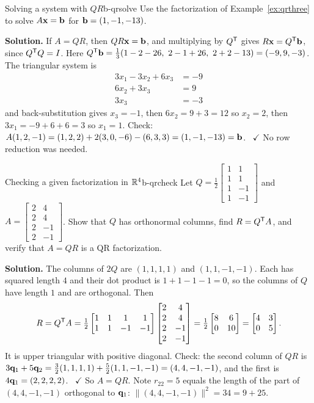 \documentclass[11pt]{article}
\begin{document}
\begin{exmp}{Solving a system with $QR$}{b-qrsolve}
Use the factorization of Example~\ref{ex:qrthree} to solve $A\mathbf{x}=\mathbf{b}$ for $\mathbf{b}=(1,-1,-13)$.

\textbf{Solution.} If $A=QR$, then $QR\mathbf{x}=\mathbf{b}$, and multiplying by $Q^{\mathsf T}$ gives $R\mathbf{x}=Q^{\mathsf T}\mathbf{b}$, since $Q^{\mathsf T} Q=I$. Here $Q\T\bv{b}=\tfrac13(1-2-26,\ 2-1+26,\ 2+2-13)=(-9,9,-3)$. The triangular system is
\[
\begin{aligned}3x_1-3x_2+6x_3&=-9\\6x_2+3x_3&=9\\3x_3&=-3\end{aligned}
\]
and back-substitution gives $x_3=-1$, then $6x_2=9+3=12$ so $x_2=2$, then $3x_1=-9+6+6=3$ so $x_1=1$. Check: $A(1,2,-1)=(1,2,2)+2(3,0,-6)-(6,3,3)=(1,-1,-13)=\mathbf{b}$. \ $\checkmark$ No row reduction was needed.
\end{exmp}

\begin{exmp}{Checking a given factorization in $\mathbb{R}^4$}{b-qrcheck}
Let $Q=\tfrac12\begin{bmatrix}1&1\\1&1\\1&-1\\1&-1\end{bmatrix}$ and $A=\begin{bmatrix}2&4\\2&4\\2&-1\\2&-1\end{bmatrix}$. Show that $Q$ has orthonormal columns, find $R=Q^{\mathsf T} A$, and verify that $A=QR$ is a QR factorization.

\textbf{Solution.} The columns of $2Q$ are $(1,1,1,1)$ and $(1,1,-1,-1)$. Each has squared length $4$ and their dot product is $1+1-1-1=0$, so the columns of $Q$ have length $1$ and are orthogonal. Then
\[
R=Q^{\mathsf T} A=\tfrac12\begin{bmatrix}1&1&1&1\\1&1&-1&-1\end{bmatrix}\begin{bmatrix}2&4\\2&4\\2&-1\\2&-1\end{bmatrix}=\tfrac12\begin{bmatrix}8&6\\0&10\end{bmatrix}=\begin{bmatrix}4&3\\0&5\end{bmatrix}.
\]
It is upper triangular with positive diagonal. Check: the second column of $QR$ is $3\mathbf{q}_1+5\mathbf{q}_2=\tfrac32(1,1,1,1)+\tfrac52(1,1,-1,-1)=(4,4,-1,-1)$, and the first is $4\mathbf{q}_1=(2,2,2,2)$. \ $\checkmark$ So $A=QR$. Note $r_{22}=5$ equals the length of the part of $(4,4,-1,-1)$ orthogonal to $\mathbf{q}_1$: $\lVert(4,4,-1,-1)\rVert^2=34=9+25$.
\end{exmp}
\end{document}
